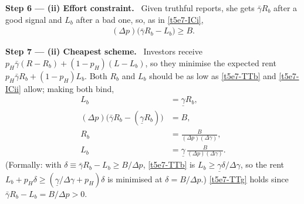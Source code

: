 \documentclass[11pt,a4paper]{article}
\newcommand{\step}[2]{\par\medskip\noindent\textbf{Step #1 --- #2.}~}
\begin{document}
\step{6}{(ii) Effort constraint} Given truthful reports, she gets $\bar\gamma R_b$ after a good signal
and $L_b$ after a bad one, so, as in \eqref{t5e7-ICi},
\begin{align}
  (\Delta p)\bigl(\bar\gamma R_b-L_b\bigr) \geq B. \label{t5e7-ICii}
\end{align}

\step{7}{(ii) Cheapest scheme} Investors receive $p_H\bar\gamma(R-R_b)+(1-p_H)(L-L_b)$, so they
minimise the expected rent $p_H\bar\gamma R_b+(1-p_H)L_b$. Both $R_b$ and $L_b$ should be as low as
\eqref{t5e7-TTb} and \eqref{t5e7-ICii} allow; making both bind,
\begin{align}
  L_b &= \underline\gamma R_b, \label{t5e7-Lb}\\
  (\Delta p)\bigl(\bar\gamma R_b-(\underline\gamma R_b)\bigr) &= B, \nonumber\\
  R_b &= \frac{B}{(\Delta p)(\Delta\gamma)}, \label{t5e7-Rb}\\
  L_b &= \underline\gamma\,\frac{B}{(\Delta p)(\Delta\gamma)}. \nonumber
\end{align}
(Formally: with $\delta\equiv\bar\gamma R_b-L_b\geq B/\Delta p$, \eqref{t5e7-TTb} is
$L_b\geq\underline\gamma\delta/\Delta\gamma$, so the rent $L_b+p_H\delta\geq(\underline\gamma/\Delta\gamma+p_H)\delta$
is minimised at $\delta=B/\Delta p$.) \eqref{t5e7-TTg} holds since $\bar\gamma R_b-L_b=B/\Delta p>0$.
\end{document}
